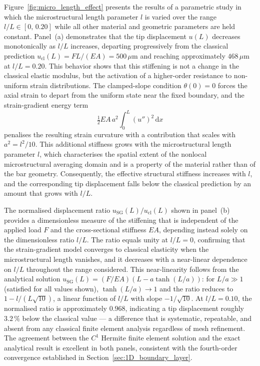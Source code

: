 \documentclass[final,3p,times,fleqn]{elsarticle}
\begin{document}
Figure~\ref{fig:micro_length_effect} presents the results of a
parametric study in which the microstructural length parameter $l$ is
varied over the range $l/L \in [0,\,0.20]$ while all other material
and geometric parameters are held constant.
Panel~(a) demonstrates that the tip displacement $u(L)$ decreases
monotonically as $l/L$ increases, departing progressively from the
classical prediction $u_{\mathrm{cl}}(L) = FL/(EA) = 500\,\mu\mathrm{m}$
and reaching approximately $468\,\mu\mathrm{m}$ at $l/L = 0.20$.
This behavior shows that this stiffening is not a change in the classical
elastic modulus, but the activation of a higher-order resistance to
non-uniform strain distributions.
The clamped-slope condition $\theta(0) = 0$ forces the axial strain to
depart from the uniform state near the fixed boundary, and the
strain-gradient energy term
%
\begin{equation*}
    \tfrac{1}{2}EA\,a^{2}\int_{0}^{L}(u'')^{2}\,\mathrm{d}x
\end{equation*}
%
penalises the resulting strain curvature with a contribution that
scales with $a^{2} = l^{2}/10$.
This additional stiffness grows with the microstructural length
parameter $l$, which characterises the spatial extent of the nonlocal
microstructural averaging domain and is a property of the material
rather than of the bar geometry.
Consequently, the effective structural stiffness increases with $l$,
and the corresponding tip displacement falls below the classical
prediction by an amount that grows with $l/L$.

The normalised displacement ratio
$u_{\mathrm{SG}}(L)/u_{\mathrm{cl}}(L)$ shown in panel~(b) provides a
dimensionless measure of the stiffening that is independent of the
applied load $F$ and the cross-sectional stiffness $EA$, depending
instead solely on the dimensionless ratio $l/L$.
The ratio equals unity at $l/L = 0$, confirming that the
strain-gradient model converges to classical elasticity when the
microstructural length vanishes, and it decreases with a near-linear
dependence on $l/L$ throughout the range considered.
This near-linearity follows from the analytical solution
$u_{\mathrm{SG}}(L) = (F/EA)(L - a\tanh(L/a))$: for $L/a \gg 1$
(satisfied for all values shown), $\tanh(L/a) \to 1$ and the ratio
reduces to $1 - l/(L\sqrt{10})$, a linear function of $l/L$ with
slope $-1/\sqrt{10}$.
At $l/L = 0.10$, the normalised ratio is approximately $0.968$,
indicating a tip displacement roughly $3.2\,\%$ below the classical
value --- a difference that is systematic, repeatable, and absent from
any classical finite element analysis regardless of mesh refinement.
The agreement between the $C^{1}$ Hermite finite element solution and
the exact analytical result is excellent in both panels, consistent
with the fourth-order convergence established in
Section~\ref{sec:1D_boundary_layer}.
\end{document}
